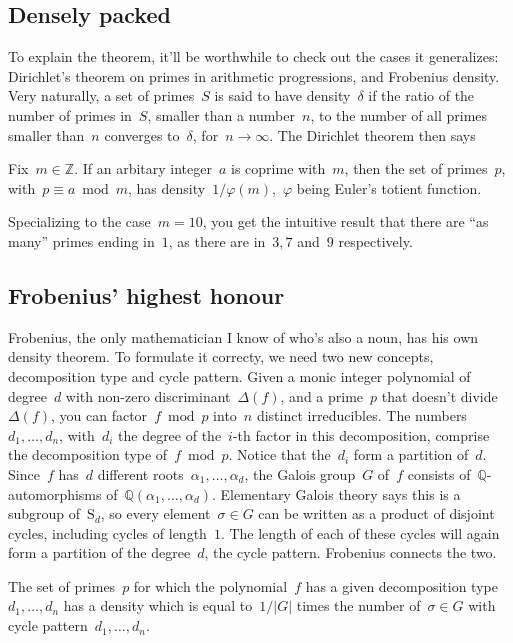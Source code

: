 \subsection{Densely packed}

To explain the theorem, it'll be worthwhile to check out the cases it generalizes: Dirichlet's theorem on primes in arithmetic progressions, and Frobenius density. Very naturally, a set of primes~$S$ is said to have density~$\delta$ if the ratio of the number of primes in~$S$, smaller than a number~$n$, to the number of all primes smaller than~$n$ converges to~$\delta$, for~$n \to \infty$. The Dirichlet theorem then says

\begin{theorem}
  Fix~$m \in \mathbb{Z}$. If an arbitary integer~$a$ is coprime with~$m$, then the set of primes~$p$, with~$p \equiv a\bmod m$, has density~$1/\varphi(m)$,~$\varphi$ being Euler's totient function.
\end{theorem}

Specializing to the case~$m=10$, you get the intuitive result that there are ``as many'' primes ending in~$1$, as there are in~$3, 7$ and~$9$ respectively.

\subsection{Frobenius' highest honour}

Frobenius, the only mathematician I know of who's also a noun, has his own density theorem. To formulate it correcty, we need two new concepts, decomposition type and cycle pattern. Given a monic integer polynomial of degree~$d$ with non-zero discriminant~$\Delta(f)$, and a prime~$p$ that doesn't divide~$\Delta(f)$, you can factor~$f\bmod p$ into~$n$ distinct irreducibles. The numbers $d_{1},\ldots,d_{n}$, with~$d_{i}$ the degree of the~$i$-th factor in this decomposition, comprise the decomposition type of~$f\bmod p$. Notice that the~$d_{i}$ form a partition of~$d$. Since~$f$ has~$d$ different roots~$\alpha_{1},\ldots,\alpha_{d}$, the Galois group~$G$ of~$f$ consists of~$\mathbb{Q}$-automorphisms of~$\mathbb{Q}(\alpha_{1},\ldots, \alpha_{d})$. Elementary Galois theory says this is a subgroup of~$\mathrm{S}_{d}$, so every element~$\sigma \in G$ can be written as a product of disjoint cycles, including cycles of length~$1$. The length of each of these cycles will again form a partition of the degree~$d$, the cycle pattern. Frobenius connects the two.

\begin{theorem}
  The set of primes~$p$ for which the polynomial~$f$ has a given decomposition type~$d_{1},\ldots,d_{n}$ has a density which is equal to~$1/\vert G \vert$ times the number of~$\sigma \in G$ with cycle pattern~$d_{1},\ldots,d_{n}$.
\end{theorem}

